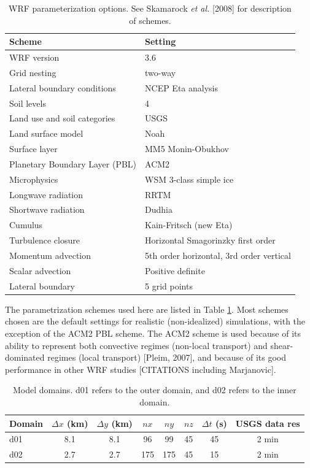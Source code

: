 \begin{table}
\begin{tabular}{l l}
\hline
Scheme & Setting \\ \hline
WRF version & 3.6 \\
Grid nesting & two-way \\
Lateral boundary conditions & NCEP Eta analysis \\
Soil levels & 4 \\
Land use and soil categories & USGS \\
Land surface model & Noah \\
Surface layer & MM5 Monin-Obukhov \\
Planetary Boundary Layer (PBL) & ACM2 \\
Microphysics & WSM 3-class simple ice \\
Longwave radiation & RRTM \\
Shortwave radiation & Dudhia \\
Cumulus & Kain-Fritsch (new Eta) \\
Turbulence closure & Horizontal Smagorinzky first order \\
Momentum advection & 5th order horizontal, 3rd order vertical \\
Scalar advection & Positive definite \\
Lateral boundary & 5 grid points \\
\hline
\end{tabular}
\caption{WRF parameterization options.  See Skamarock \textit{et al.} [2008] for description of schemes.}
\label{table:BL_paramschemes}
\end{table}

The parametrization schemes used here are listed in Table \ref{table:BL_paramschemes}.  Most schemes chosen are the default settings for realistic (non-idealized) simulations, with the exception of the ACM2 PBL scheme. The ACM2 scheme is used because of its ability to represent both convective regimes (non-local transport) and shear-dominated regimes (local transport) [Pleim, 2007], and because of its good performance in other WRF studies [CITATIONS including Marjanovic].

\begin{table}
\begin{tabular}{ l c c c c c c c }
\hline
Domain & $\Delta x$ (km) & $\Delta y$ (km) & $nx$ & $ny$ & $nz$ & $\Delta t$ (s) & USGS data res \\ \hline
d01 & 8.1 & 8.1 & 96 & 99 & 45 & 45 & 2 min\\
d02 & 2.7 & 2.7 & 175 & 175 & 45 & 15 & 2 min\\
\hline
\end{tabular}
\caption{Model domains. d01 refers to the outer domain, and d02 refers to the inner domain.}
\label{table:BL_domains}
\end{table}

